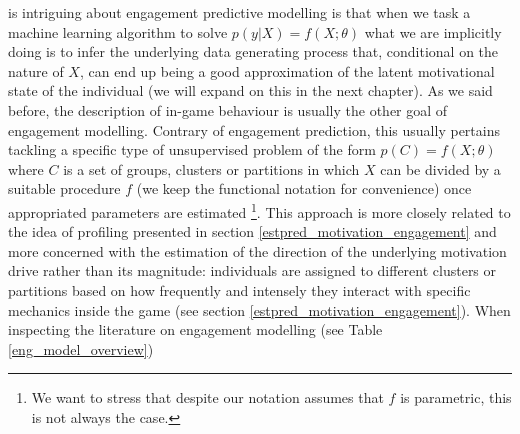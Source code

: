 is intriguing about engagement predictive modelling is that when we task a machine learning algorithm to solve $p(y|X) = f(X; \theta)$ what we are implicitly doing is to infer the underlying data generating process that, conditional on the nature of $X$, can end up being a good approximation of the latent motivational state of the individual (we will expand on this in the next chapter). As we said before, the description of in-game behaviour is usually the other goal of engagement modelling. Contrary of engagement prediction, this usually pertains tackling a specific type of unsupervised problem of the form $p(C) = f(X; \theta)$ where $C$ is a set of groups, clusters or partitions in which $X$ can be divided by a suitable procedure $f$ (we keep the functional notation for convenience) once appropriated parameters are estimated \cite{bishop2006pattern} \footnote{We want to stress that despite our notation assumes that $f$ is parametric, this is not always the case.}. This approach is more closely related to the idea of profiling presented in section \ref{estpred_motivation_engagement} and more concerned with the estimation of the direction of the underlying motivation drive rather than its magnitude: individuals are assigned to different clusters or partitions based on how frequently and intensely they interact with specific mechanics inside the game (see section \ref{estpred_motivation_engagement}). When inspecting the literature on engagement modelling (see Table \ref{eng_model_overview}) 

